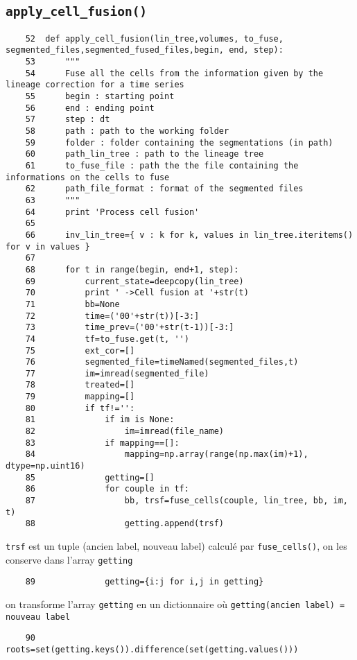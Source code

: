 \documentclass{article}
\def \mycolor {red}
\begin{document}
\subsection{\texttt{apply\_cell\_fusion()}}
\label{sec:apply:cell:fusion}
\begin{verbatim}
    52	def apply_cell_fusion(lin_tree,volumes, to_fuse, segmented_files,segmented_fused_files,begin, end, step):
    53	    """
    54	    Fuse all the cells from the information given by the lineage correction for a time series
    55	    begin : starting point
    56	    end : ending point
    57	    step : dt
    58	    path : path to the working folder
    59	    folder : folder containing the segmentations (in path)
    60	    path_lin_tree : path to the lineage tree
    61	    to_fuse_file : path the the file containing the informations on the cells to fuse
    62	    path_file_format : format of the segmented files
    63	    """
    64	    print 'Process cell fusion'
    65	
    66	    inv_lin_tree={ v : k for k, values in lin_tree.iteritems() for v in values }
    67	
    68	    for t in range(begin, end+1, step):
    69	        current_state=deepcopy(lin_tree)
    70	        print ' ->Cell fusion at '+str(t)
    71	        bb=None
    72	        time=('00'+str(t))[-3:]
    73	        time_prev=('00'+str(t-1))[-3:]
    74	        tf=to_fuse.get(t, '')
    75	        ext_cor=[]
    76	        segmented_file=timeNamed(segmented_files,t)
    77	        im=imread(segmented_file)
    78	        treated=[]
    79	        mapping=[]
    80	        if tf!='':
    81	            if im is None:
    82	                im=imread(file_name)
    83	            if mapping==[]:
    84	                mapping=np.array(range(np.max(im)+1), dtype=np.uint16)
    85	            getting=[]
    86	            for couple in tf:
    87	                bb, trsf=fuse_cells(couple, lin_tree, bb, im, t)
    88	                getting.append(trsf)
\end{verbatim} 
\color{\mycolor}
\verb|trsf| est un tuple (ancien label, nouveau label) calcul\'e par \verb|fuse_cells()|, on les conserve dans l'array \verb|getting|
\color{black}
\begin{verbatim}
    89	            getting={i:j for i,j in getting}
\end{verbatim} 
\color{\mycolor}
on transforme l'array \verb|getting| en un dictionnaire o\`u
\verb|getting(ancien label) = nouveau label|
\color{black}
\begin{verbatim}
    90	            roots=set(getting.keys()).difference(set(getting.values()))
\end{verbatim} 
\end{document}
